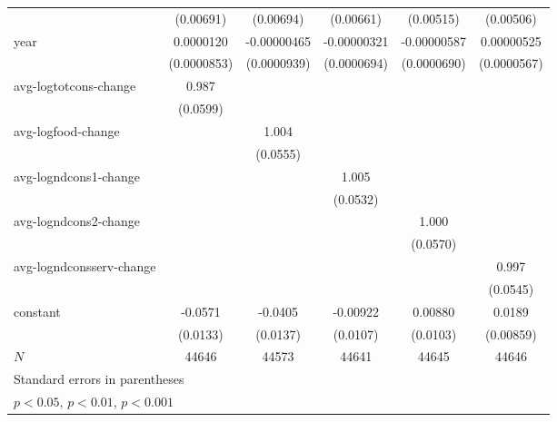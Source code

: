 \begin{table}[htbp]
\begin{tabular}{l*{5}{c}}
            &   (0.00691)         &   (0.00694)         &   (0.00661)         &   (0.00515)         &   (0.00506)         \\
year        &   0.0000120         & -0.00000465         & -0.00000321         & -0.00000587         &  0.00000525         \\
            & (0.0000853)         & (0.0000939)         & (0.0000694)         & (0.0000690)         & (0.0000567)         \\
avg-logtotcons-change&       0.987\sym{***}&                     &                     &                     &                     \\
            &    (0.0599)         &                     &                     &                     &                     \\
avg-logfood-change&                     &       1.004\sym{***}&                     &                     &                     \\
            &                     &    (0.0555)         &                     &                     &                     \\
avg-logndcons1-change&                     &                     &       1.005\sym{***}&                     &                     \\
            &                     &                     &    (0.0532)         &                     &                     \\
avg-logndcons2-change&                     &                     &                     &       1.000\sym{***}&                     \\
            &                     &                     &                     &    (0.0570)         &                     \\
avg-logndconsserv-change&                     &                     &                     &                     &       0.997\sym{***}\\
            &                     &                     &                     &                     &    (0.0545)         \\
constant    &     -0.0571\sym{***}&     -0.0405\sym{**} &    -0.00922         &     0.00880         &      0.0189\sym{*}  \\
            &    (0.0133)         &    (0.0137)         &    (0.0107)         &    (0.0103)         &   (0.00859)         \\
\hline
\(N\)       &       44646         &       44573         &       44641         &       44645         &       44646         \\
\hline\hline
\multicolumn{6}{l}{\footnotesize Standard errors in parentheses}\\
\multicolumn{6}{l}{\footnotesize \sym{*} \(p<0.05\), \sym{**} \(p<0.01\), \sym{***} \(p<0.001\)}\\
\end{tabular}
\end{table}
